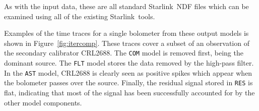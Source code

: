 \documentclass[twoside,11pt]{article}
\newcommand{\htmladdnormallink}[2]{#1}
\renewcommand{\_}{\texttt{\symbol{95}}}
\newcommand{\starlink}{\htmladdnormallink{Starlink}{http://starlink.jach.hawaii.edu}}
\begin{document}
As with the input data, these are all standard \starlink\ NDF files
which can be examined using all of the existing \starlink\ tools.

Examples of the time traces for a single bolometer from these output
models is shown in Figure~\ref{fig:itercomp}.  These traces cover a
subset of an observation of the secondary calibrator CRL2688. The
\texttt{COM} model is removed first, being the dominant source. The
\texttt{FLT} model stores the data removed by the high-pass filter. In
the \texttt{AST} model, CRL2688 is clearly seen as positive spikes
which appear when the bolometer passes over the source. Finally, the
residual signal stored in \texttt{RES} is flat, indicating that most
of the signal has been successfully accounted for by the other model
components.


\renewcommand*\arraystretch{0.85}
\end{document}
